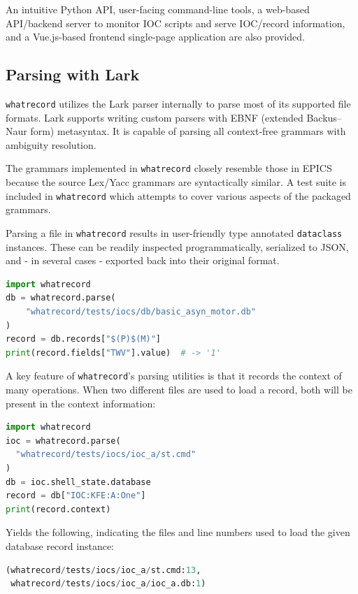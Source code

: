 \documentclass[letter,
               keeplastbox,   %
               ]{jacow}
\begin{document}
An intuitive Python API, user-facing command-line tools, a web-based
API/backend server to monitor IOC scripts and serve IOC/record information, and
a Vue.js-based frontend single-page application are also provided.

\subsection{Parsing with Lark}

\verb_whatrecord_ utilizes the Lark\cite{lark} parser internally to parse most of its supported
file formats.  Lark supports writing custom parsers with EBNF (extended
Backus–Naur form) metasyntax.  It is capable of parsing all context-free
grammars with ambiguity resolution. 

The grammars implemented in \verb_whatrecord_ closely resemble those in EPICS because
the source Lex/Yacc grammars are syntactically similar.  A test suite is
included in \verb_whatrecord_ which attempts to cover various aspects of the packaged
grammars.

Parsing a file in \verb_whatrecord_ results in user-friendly type annotated
\verb_dataclass_ instances. These can be readily inspected programmatically,
serialized to JSON, and - in several cases - exported back into their original
format.

\begin{lstlisting}[language=python]
import whatrecord
db = whatrecord.parse(
    "whatrecord/tests/iocs/db/basic_asyn_motor.db"
)
record = db.records["$(P)$(M)"]
print(record.fields["TWV"].value)  # -> '1'
\end{lstlisting}

A key feature of \verb_whatrecord_'s parsing utilities is that it records the context
of many operations.  When two different files are used to load a record,
both will be present in the context information:

\begin{lstlisting}[language=python]
import whatrecord
ioc = whatrecord.parse(
  "whatrecord/tests/iocs/ioc_a/st.cmd"
)
db = ioc.shell_state.database
record = db["IOC:KFE:A:One"]
print(record.context)
\end{lstlisting}

Yields the following, indicating the files and line numbers used to load the
given database record instance:
\begin{lstlisting}[language=python]
(whatrecord/tests/iocs/ioc_a/st.cmd:13,
 whatrecord/tests/iocs/ioc_a/ioc_a.db:1)
\end{lstlisting}
\end{document}
